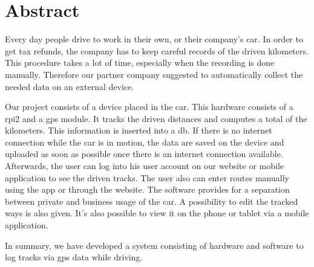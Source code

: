 \chapter*{Abstract}
Every day people drive to work in their own, or their company's car. In order to get tax refunds, the company has to keep careful records of the driven kilometers. This procedure takes a lot of time,  especially when the recording is done manually. Therefore our partner company suggested to automatically collect the needed data on an external device.\newline

Our project consists of a device placed in the car. This hardware consists of a \gls{rpi2} and a \gls{gps} module. It tracks the driven distances and computes a total of the kilometers. This information is inserted into a \gls{db}. If there is no internet connection while the car is in motion, the data are saved on the device and uploaded as soon as possible once there is an internet connection available. Afterwards, the user can log into his user account on our website or mobile application to see the driven tracks. The user also can enter routes manually using the app or through the website. The software provides for a separation between private and business usage of the car. A possibility to edit the tracked ways is also given. It's also possible to view it on the phone or tablet via a mobile application.\newline

In summary, we have developed a system consisting of hardware and software to log tracks via \gls{gps} data while driving.
\clearpageauthor